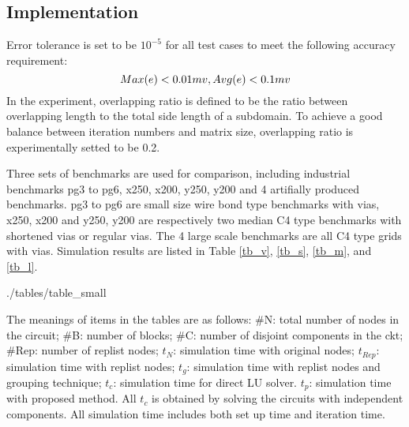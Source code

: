 \documentclass{sig-alternate}
\begin{document}
  \subsection{Implementation}
	Error tolerance is set to be $10^{-5}$ for all test cases to meet the following accuracy requirement:
	\begin{equation}
		Max(e) < 0.01 mv, Avg(e) < 0.1 mv\\ \label{eq_err}
	\end{equation}
	In the experiment, overlapping ratio is defined to be the ratio between overlapping length to the total side length of 
	a subdomain. To achieve a good balance between iteration numbers and matrix size, overlapping ratio is experimentally 
	setted to be 0.2.
			
	Three sets of benchmarks are used for comparison, including 
	industrial benchmarks pg3 to pg6, x250, x200, y250, y200 and 4 artifially produced benchmarks. pg3 to pg6 are 
	small size wire bond type benchmarks with vias, x250, x200 and y250, y200 are respectively two median C4 type benchmarks with
	shortened vias or regular vias. The 4 large scale benchmarks are all C4 type grids with vias. Simulation results are 
	listed in Table \ref{tb_v}, \ref{tb_s}, \ref{tb_m}, and \ref{tb_l}.
	\begin{table}[h]
	   \label{tb_v}
  	   {./tables/table_small} \label{tb_s}
	\end{table}
	\begin{table}[h]
  	   \label{tb_m}
  	   \label{tb_l}
	\end{table}

	The meanings of items in the tables are as follows: \#N: total number of nodes in the circuit; 
	\#B: number of blocks; \#C: number of disjoint components in the ckt; \#Rep: number of replist nodes; 
  	$t_N$: simulation time with original nodes; $t_{Rep}$: simulation time with replist nodes; 
	$t_g$: simulation time with replist nodes and grouping technique; $t_c$: simulation time for direct LU solver. 
	$t_p$: simulation time with proposed method.  
	All $t_c$ is obtained by solving the circuits with independent components. All 
	simulation time includes both set up time and iteration time.
\end{document}
